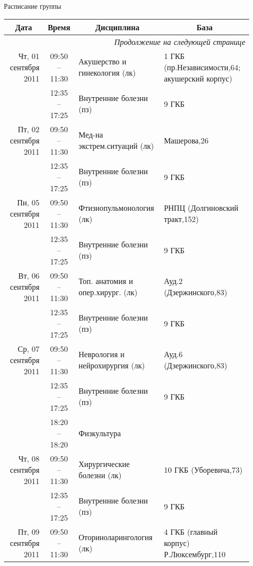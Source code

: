 \documentclass[a4paper,10pt,notitlepage]{report}
\begin{document}
\begin{center}

{\Large Расписание группы }
{\footnotesize
\begin{longtable}{r|c|l|l|}

\hline \multicolumn{1}{|c|}{\textbf{Дата}} &
\multicolumn{1}{c|}{\textbf{Время}} &
\multicolumn{1}{c|}{\textbf{Дисциплина}} &
\multicolumn{1}{c|}{\textbf{База}} \\
\hline
\hline
\endhead

\multicolumn{4}{r|}{{\slshape Продолжение на следующей странице}} \\
\endfoot

\hline
\endlastfoot

\hline Чт, 01 сентября 2011
  & 09:50 -- 11:30 & Акушерство и гинекология (лк) & 1 ГКБ (пр.Независимости,64; акушерский корпус) \\ \cline{2-4}
  & 12:35 -- 17:25 & Внутренние болезни (пз) & 9 ГКБ \\ \cline{2-4}
\hline Пт, 02 сентября 2011
  & 09:50 -- 11:30 & Мед-на экстрем.ситуаций (лк) & Машерова,26 \\ \cline{2-4}
  & 12:35 -- 17:25 & Внутренние болезни (пз) & 9 ГКБ \\ \cline{2-4}
\hline Пн, 05 сентября 2011
  & 09:50 -- 11:30 & Фтизиопульмонология (лк) & РНПЦ (Долгиновский тракт,152) \\ \cline{2-4}
  & 12:35 -- 17:25 & Внутренние болезни (пз) & 9 ГКБ \\ \cline{2-4}
\hline Вт, 06 сентября 2011
  & 09:50 -- 11:30 & Топ. анатомия и опер.хирург. (лк) & Ауд.2 (Дзержинского,83) \\ \cline{2-4}
  & 12:35 -- 17:25 & Внутренние болезни (пз) & 9 ГКБ \\ \cline{2-4}
\hline Ср, 07 сентября 2011
  & 09:50 -- 11:30 & Неврология и нейрохирургия (лк) & Ауд.6 (Дзержинского,83) \\ \cline{2-4}
  & 12:35 -- 17:25 & Внутренние болезни (пз) & 9 ГКБ \\ \cline{2-4}
  & 18:20 -- 18:20 & Физкультура  &  \\ \cline{2-4}
\hline Чт, 08 сентября 2011
  & 09:50 -- 11:30 & Хирургические болезни (лк) & 10 ГКБ (Уборевича,73) \\ \cline{2-4}
  & 12:35 -- 17:25 & Внутренние болезни (пз) & 9 ГКБ \\ \cline{2-4}
\hline Пт, 09 сентября 2011
  & 09:50 -- 11:30 & Оториноларингология (лк) & 4 ГКБ (главный корпус) Р.Люксембург,110 \\ \cline{2-4}

\end{longtable}}
\end{center}
\end{document}
